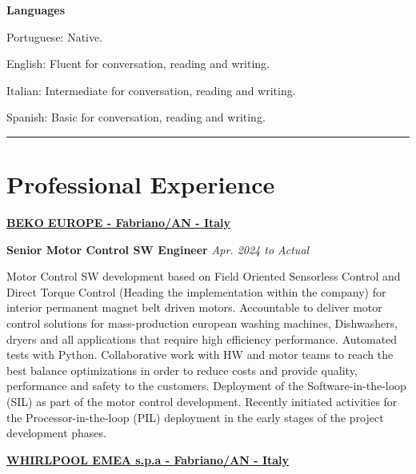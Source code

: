 \documentclass[10pt]{article}
\begin{document}
\blankline

\textbf{Languages}
\begin{compactouterlist}
\item[] Portuguese: Native.
\item[] English: Fluent for conversation, reading and writing.
\item[] Italian: Intermediate for conversation, reading and writing.
\item[] Spanish: Basic for conversation, reading and writing.
\end{compactouterlist}

\blankline
\hrule

\section{Professional Experience}

\href{https://www.beko.com}{\textbf{BEKO EUROPE - Fabriano/AN - Italy}}

\begin{outerlist}

\item[] \textbf{Senior Motor Control SW Engineer}%
    \hfill \textit{Apr. 2024 to Actual}
    \begin{innerlist}
        \item Motor Control SW development based on Field Oriented Sensorless Control and Direct Torque Control (Heading the implementation within the company) for interior permanent magnet belt driven motors. Accountable to deliver motor control solutions for mass-production european washing machines, Dishwashers, dryers and all applications that require high efficiency performance. Automated tests with Python. Collaborative work with HW and motor teams to reach the best balance optimizations in order to reduce costs and provide quality, performance and safety to the customers. Deployment of the Software-in-the-loop (SIL) as part of the motor control development. Recently initiated activities for the Processor-in-the-loop (PIL) deployment in the early stages of the project development phases.
    \end{innerlist}
\end{outerlist}

\blankline
%

\href{https://www.whirlpool.eu/}{\textbf{WHIRLPOOL EMEA s.p.a - Fabriano/AN - Italy}}
\end{document}

